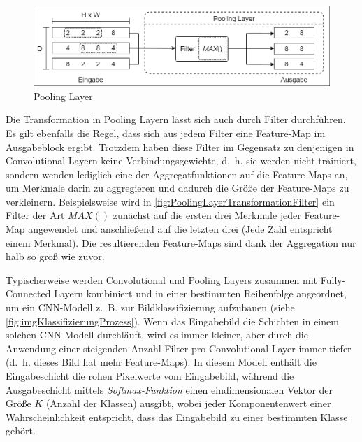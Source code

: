 \begin{description}

	\begin{figure}[!h]
		\centering
		\includegraphics[width=\linewidth]{images/PoolingLayerTransformationFilter}
		\caption{Pooling Layer}
		\label{fig:PoolingLayerTransformationFilter}
	\end{figure}

	Die Transformation in Pooling Layern lässt sich auch durch Filter durchführen. Es gilt ebenfalls die Regel, dass sich aus jedem Filter eine Feature-Map im Ausgabeblock ergibt. Trotzdem haben diese Filter im Gegensatz zu denjenigen in Convolutional Layern keine Verbindungsgewichte, d.~h. sie werden nicht trainiert, sondern wenden lediglich eine der Aggregatfunktionen auf die Feature-Maps an, um Merkmale darin zu aggregieren und dadurch die Größe der Feature-Maps zu verkleinern. Beispielsweise wird in \autoref{fig:PoolingLayerTransformationFilter} ein Filter der Art $MAX()$ zunächst auf die ersten drei Merkmale jeder Feature-Map angewendet und anschließend auf die letzten drei (Jede Zahl entspricht einem Merkmal). Die resultierenden Feature-Maps sind dank der Aggregation nur halb so groß wie zuvor.

\end{description}

Typischerweise werden Convolutional und Pooling Layers zusammen mit Fully-Connected Layern kombiniert und in einer bestimmten Reihenfolge angeordnet, um ein CNN-Modell z.~B. zur Bildklassifizierung aufzubauen (siehe \autoref{fig:imgKlassifizierungProzess}). Wenn das Eingabebild die Schichten in einem solchen CNN-Modell durchläuft, wird es immer kleiner, aber durch die Anwendung einer steigenden Anzahl Filter pro Convolutional Layer immer tiefer (d.~h. dieses Bild hat mehr Feature-Maps). In diesem Modell enthält die Eingabeschicht die rohen Pixelwerte vom Eingabebild, während die Ausgabeschicht mittels \emph{Softmax-Funktion} einen eindimensionalen Vektor der Größe $K$ (Anzahl der Klassen) ausgibt, wobei jeder Komponentenwert einer Wahrscheinlichkeit entspricht, dass das Eingabebild zu einer bestimmten Klasse gehört.

